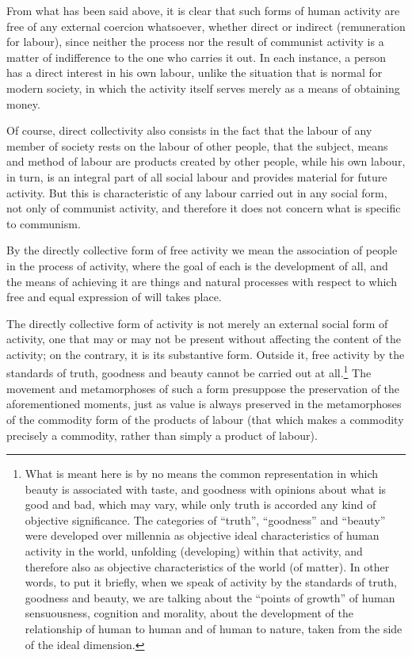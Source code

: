 \documentclass[12pt,a4paper,openany]{book}
\begin{document}
From what has been said above, it is clear that such forms of human activity are free of any external coercion whatsoever, whether direct or indirect (remuneration for labour), since neither the process nor the result of communist activity is a matter of indifference to the one who carries it out. In each instance, a person has a direct interest in his own labour, unlike the situation that is normal for modern society, in which the activity itself serves merely as a means of obtaining money.

Of course, direct collectivity also consists in the fact that the labour of any member of society rests on the labour of other people, that the subject, means and method of labour are products created by other people, while his own labour, in turn, is an integral part of all social labour and provides material for future activity. But this is characteristic of any labour carried out in any social form, not only of communist activity, and therefore it does not concern what is specific to communism.

By the directly collective form of free activity we mean the association of people in the process of activity, where the goal of each is the development of all, and the means of achieving it are things and natural processes with respect to which free and equal expression of will takes place.

The directly collective form of activity is not merely an external social form of activity, one that may or may not be present without affecting the content of the activity; on the contrary, it is its substantive form. Outside it, free activity by the standards of truth, goodness and beauty cannot be carried out at all.\footnote{What is meant here is by no means the common representation in which beauty is associated with taste, and goodness with opinions about what is good and bad, which may vary, while only truth is accorded any kind of objective significance. The categories of “truth”, “goodness” and “beauty” were developed over millennia as objective ideal characteristics of human activity in the world, unfolding (developing) within that activity, and therefore also as objective characteristics of the world (of matter). In other words, to put it briefly, when we speak of activity by the standards of truth, goodness and beauty, we are talking about the “points of growth” of human sensuousness, cognition and morality, about the development of the relationship of human to human and of human to nature, taken from the side of the ideal dimension.} The movement and metamorphoses of such a form presuppose the preservation of the aforementioned moments, just as value is always preserved in the metamorphoses of the commodity form of the products of labour (that which makes a commodity precisely a commodity, rather than simply a product of labour).
\end{document}

